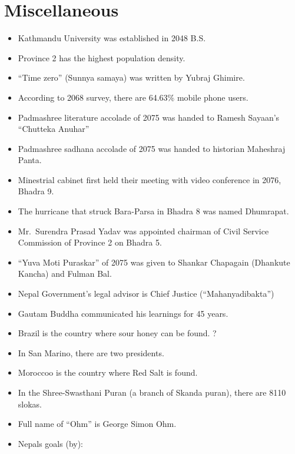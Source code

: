 \documentclass[
  openany]{book}
\providecommand{\tightlist}{%
  \setlength{\itemsep}{0pt}\setlength{\parskip}{0pt}}
\begin{document}
\hypertarget{miscellaneous-1}{%
\section{Miscellaneous}\label{miscellaneous-1}}

\begin{itemize}
\tightlist
\item
  Kathmandu University was established in 2048 B.S.
\item
  Province 2 has the highest population density.
\item
  ``Time zero'' (Sunnya samaya) was written by Yubraj Ghimire.
\item
  According to 2068 survey, there are 64.63\% mobile phone users.
\item
  Padmashree literature accolade of 2075 was handed to Ramesh Sayaan's ``Chutteka Anuhar''
\item
  Padmashree sadhana accolade of 2075 was handed to historian Maheshraj Panta.
\item
  Minestrial cabinet first held their meeting with video conference in 2076, Bhadra 9.
\item
  The hurricane that struck Bara-Parsa in Bhadra 8 was named Dhumrapat.
\item
  Mr.~Surendra Prasad Yadav was appointed chairman of Civil Service Commission of Province 2 on Bhadra 5.
\item
  ``Yuva Moti Puraskar'' of 2075 was given to Shankar Chapagain (Dhankute Kancha) and Fulman Bal.
\item
  Nepal Government's legal advisor is Chief Justice (``Mahanyadibakta'')
\item
  Gautam Buddha communicated his learnings for 45 years.
\item
  Brazil is the country where sour honey can be found. ?
\item
  In San Marino, there are two presidents.
\item
  Moroccoo is the country where Red Salt is found.
\item
  In the Shree-Swasthani Puran (a branch of Skanda puran), there are 8110 slokas.
\item
  Full name of ``Ohm'' is George Simon Ohm.
\item
  Nepals goals (by):


\end{itemize}
\end{document}
